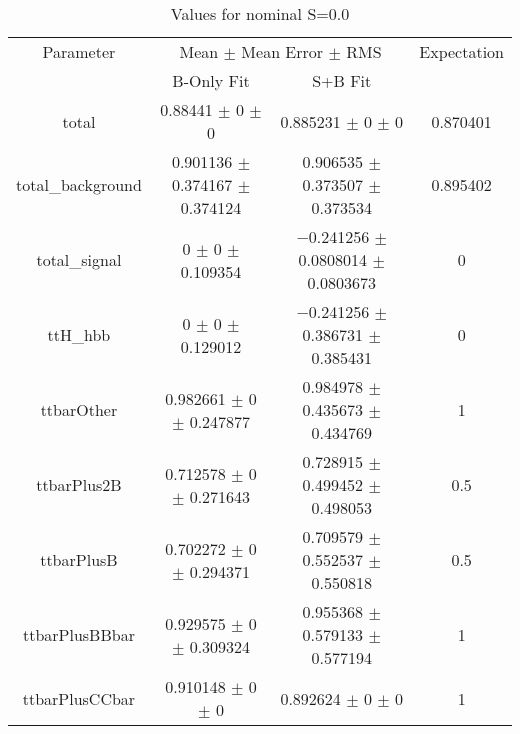 \begin{table}
\centering
\caption{Values for nominal S=0.0}
\begin{tabular}{cccc}
\toprule
Parameter & \multicolumn{2}{c}{Mean $\pm$ Mean Error $\pm$ RMS} & Expectation\\
 & B-Only Fit & S+B Fit & \\
\midrule
total & \num{0.88441} $\pm$ \num{0} $\pm$ \num{0} & \num{0.885231} $\pm$ \num{0} $\pm$ \num{0} & \num{0.870401}\\
total\_background & \num{0.901136} $\pm$ \num{0.374167} $\pm$ \num{0.374124} & \num{0.906535} $\pm$ \num{0.373507} $\pm$ \num{0.373534} & \num{0.895402}\\
total\_signal & \num{0} $\pm$ \num{0} $\pm$ \num{0.109354} & \num{-0.241256} $\pm$ \num{0.0808014} $\pm$ \num{0.0803673} & \num{0}\\
ttH\_hbb & \num{0} $\pm$ \num{0} $\pm$ \num{0.129012} & \num{-0.241256} $\pm$ \num{0.386731} $\pm$ \num{0.385431} & \num{0}\\
ttbarOther & \num{0.982661} $\pm$ \num{0} $\pm$ \num{0.247877} & \num{0.984978} $\pm$ \num{0.435673} $\pm$ \num{0.434769} & \num{1}\\
ttbarPlus2B & \num{0.712578} $\pm$ \num{0} $\pm$ \num{0.271643} & \num{0.728915} $\pm$ \num{0.499452} $\pm$ \num{0.498053} & \num{0.5}\\
ttbarPlusB & \num{0.702272} $\pm$ \num{0} $\pm$ \num{0.294371} & \num{0.709579} $\pm$ \num{0.552537} $\pm$ \num{0.550818} & \num{0.5}\\
ttbarPlusBBbar & \num{0.929575} $\pm$ \num{0} $\pm$ \num{0.309324} & \num{0.955368} $\pm$ \num{0.579133} $\pm$ \num{0.577194} & \num{1}\\
ttbarPlusCCbar & \num{0.910148} $\pm$ \num{0} $\pm$ \num{0} & \num{0.892624} $\pm$ \num{0} $\pm$ \num{0} & \num{1}\\
\bottomrule
\end{tabular}
\end{table}